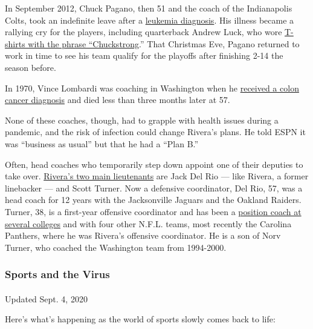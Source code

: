 In September 2012, Chuck Pagano, then 51 and the coach of the
Indianapolis Colts, took an indefinite leave after a
\href{https://www.nytimes3xbfgragh.onion/2012/10/04/sports/football/colts-try-to-focus-as-coach-chuck-pagano-fights-leukemia.html}{leukemia
diagnosis}. His illness became a rallying cry for the players, including
quarterback Andrew Luck, who wore
\href{https://www.si.com/nfl/2019/12/24/chuck-pagano-cancer-leukemia-impact}{T-shirts
with the phrase ``Chuckstrong}.'' That Christmas Eve, Pagano returned to
work in time to see his team qualify for the playoffs after finishing
2-14 the season before.

In 1970, Vince Lombardi was coaching in Washington when he
\href{https://www.nytimes3xbfgragh.onion/1970/09/04/archives/vince-lombardi-football-coach-dies-vince-lombardi-pro-football.html}{received
a colon cancer diagnosis} and died less than three months later at 57.

None of these coaches, though, had to grapple with health issues during
a pandemic, and the risk of infection could change Rivera's plans. He
told ESPN it was ``business as usual'' but that he had a ``Plan B.''

Often, head coaches who temporarily step down appoint one of their
deputies to take over.
\href{https://www.washingtonfootball.com/team/coaches-roster/}{Rivera's
two main lieutenants} are Jack Del Rio --- like Rivera, a former
linebacker --- and Scott Turner. Now a defensive coordinator, Del Rio,
57, was a head coach for 12 years with the Jacksonville Jaguars and the
Oakland Raiders. Turner, 38, is a first-year offensive coordinator and
has been a
\href{https://www.pro-football-reference.com/coaches/TurnSc0.htm}{position
coach at several colleges} and with four other N.F.L. teams, most
recently the Carolina Panthers, where he was Rivera's offensive
coordinator. He is a son of Norv Turner, who coached the Washington team
from 1994-2000.

\hypertarget{sports-and-the-virus}{%
\subsubsection{Sports and the Virus}\label{sports-and-the-virus}}

\paragraph{}

Updated Sept. 4, 2020

Here's what's happening as the world of sports slowly comes back to
life:

